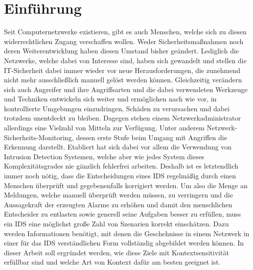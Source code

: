\chapter{Einführung}
\label{cha:introduction}


Seit Computernetzwerke existieren, gibt es auch Menschen, welche sich zu diesen widerrechtlichen Zugang verschaffen wollen. Weder Sicherheitsmaßnahmen noch deren Weiterentwicklung haben diesen Umstand bisher geändert. Lediglich die Netzwerke, welche dabei von Interesse sind, haben sich gewandelt und stellen die IT-Sicherheit dabei immer wieder vor neue Herausforderungen, die zunehmend nicht mehr ausschließlich manuell gelöst werden können. Gleichzeitig verändern sich auch Angreifer und ihre Angriffsarten und die dabei verwendeten Werkzeuge und Techniken entwickeln sich weiter und ermöglichen nach wie vor, in kontrollierte Umgebungen einzudringen, Schäden zu verursachen und dabei trotzdem unentdeckt zu bleiben. Dagegen stehen einem Netzwerkadministrator allerdings eine Vielzahl von Mitteln zur Verfügung. Unter anderem Netzwerk-Sicherheits-Monitoring, dessen erste Stufe beim Umgang mit Angriffen die Erkennung darstellt. Etabliert hat sich dabei vor allem die Verwendung von Intrusion Detection Systemen, welche aber wie jedes System dieses Komplexitätsgrades nie gänzlich fehlerfrei arbeiten. Deshalb ist es letztendlich immer noch nötig, dass die Entscheidungen eines IDS regelmäßig durch einen Menschen überprüft und gegebenenfalls korrigiert werden. Um also die Menge an Meldungen, welche manuell überprüft werden müssen, zu verringern und die Aussagekraft der erzeugten Alarme zu erhöhen und damit den menschlichen Entscheider zu entlasten sowie generell seine Aufgaben besser zu erfüllen, muss ein IDS eine möglichst große Zahl von Szenarien korrekt einschätzen. Dazu werden Informationen benötigt, mit denen die Geschehnisse in einem Netzwerk in einer für das IDS verständlichen Form vollständig abgebildet werden können. In dieser Arbeit soll ergründet werden, wie diese Ziele mit Kontextsensitivität erfüllbar sind und welche Art von Kontext dafür am besten geeignet ist.